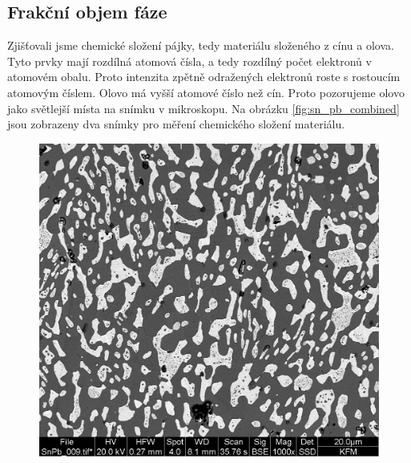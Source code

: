 \subsection{Frakční objem fáze}

Zjišťovali jsme chemické složení pájky, tedy materiálu složeného z cínu a olova. Tyto prvky mají rozdílná atomová čísla, a tedy rozdílný počet elektronů v atomovém obalu. Proto intenzita zpětně odražených elektronů roste s rostoucím atomovým číslem. Olovo má vyšší atomové číslo než cín. Proto pozorujeme olovo jako světlejší místa na snímku v mikroskopu. Na obrázku \ref{fig:sn_pb_combined} jsou zobrazeny dva snímky pro měření chemického složení materiálu. 

\begin{figure}[!h]
    \centering
    \begin{minipage}[b]{0.48\linewidth}
        \centering
        \includegraphics[width=\linewidth]{A18 - SEM/SnPb_009.jpg}
    \end{minipage}
    \hfill
    \begin{minipage}[b]{0.48\linewidth}
        \centering

\end{minipage}
\end{figure}

